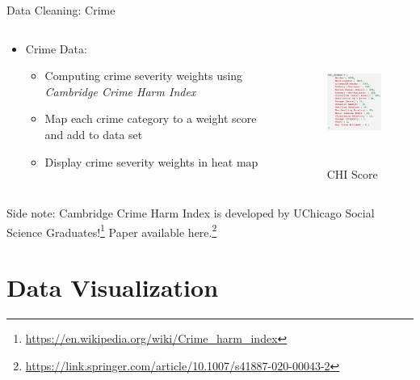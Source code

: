 \documentclass{beamer}
\begin{document}
\begin{frame}{Data Cleaning: Crime}
    \begin{columns}
        \begin{column}{0.65\textwidth}
    \begin{itemize}
        \item Crime Data:
        \begin{itemize}
            \item Computing crime severity weights using \textit{Cambridge Crime Harm Index}
            \item Map each crime category to a weight score and add to data set
            \item Display crime severity weights in heat map
        \end{itemize}
    \end{itemize}
        \end{column}
        
    \begin{column}{0.35\textwidth}
        \begin{figure}[H]
			\centering
			\includegraphics[height=4cm, width=3.5cm]{figs/chi_scores.png}
			\caption{CHI Score}
			\end{figure}
    \end{column}
    \end{columns}
    
    Side note: Cambridge Crime Harm Index is developed by UChicago Social Science Graduates!\footnote{\url{https://en.wikipedia.org/wiki/Crime_harm_index}} Paper available here.\footnote{\url{https://link.springer.com/article/10.1007/s41887-020-00043-2}}
\end{frame}



\section{Data Visualization}
\end{document}
